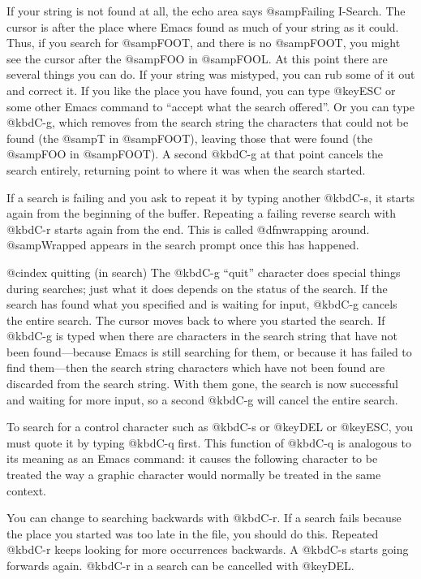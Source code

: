 {{{{{{{{  If your string is not found at all, the echo area says @samp{Failing
I-Search}.  The cursor is after the place where Emacs found as much of your
string as it could.  Thus, if you search for @samp{FOOT}, and there is no
@samp{FOOT}, you might see the cursor after the @samp{FOO} in @samp{FOOL}.
At this point there are several things you can do.  If your string was
mistyped, you can rub some of it out and correct it.  If you like the place
you have found, you can type @key{ESC} or some other Emacs command to
``accept what the search offered''.  Or you can type @kbd{C-g}, which
removes from the search string the characters that could not be found (the
@samp{T} in @samp{FOOT}), leaving those that were found (the @samp{FOO} in
@samp{FOOT}).  A second @kbd{C-g} at that point cancels the search
entirely, returning point to where it was when the search started.

  If a search is failing and you ask to repeat it by typing another
@kbd{C-s}, it starts again from the beginning of the buffer.  Repeating
a failing reverse search with @kbd{C-r} starts again from the end.  This
is called @dfn{wrapping around}.  @samp{Wrapped} appears in the search
prompt once this has happened.

@cindex quitting (in search)
  The @kbd{C-g} ``quit'' character does special things during searches;
just what it does depends on the status of the search.  If the search has
found what you specified and is waiting for input, @kbd{C-g} cancels the
entire search.  The cursor moves back to where you started the search.  If
@kbd{C-g} is typed when there are characters in the search string that have
not been found---because Emacs is still searching for them, or because it
has failed to find them---then the search string characters which have not
been found are discarded from the search string.  With them gone, the
search is now successful and waiting for more input, so a second @kbd{C-g}
will cancel the entire search.

  To search for a control character such as @kbd{C-s} or @key{DEL} or @key{ESC},
you must quote it by typing @kbd{C-q} first.  This function of @kbd{C-q} is
analogous to its meaning as an Emacs command: it causes the following
character to be treated the way a graphic character would normally be
treated in the same context.

  You can change to searching backwards with @kbd{C-r}.  If a search fails
because the place you started was too late in the file, you should do this.
Repeated @kbd{C-r} keeps looking for more occurrences backwards.  A
@kbd{C-s} starts going forwards again.  @kbd{C-r} in a search can be cancelled
with @key{DEL}.

}}}}}}}}
